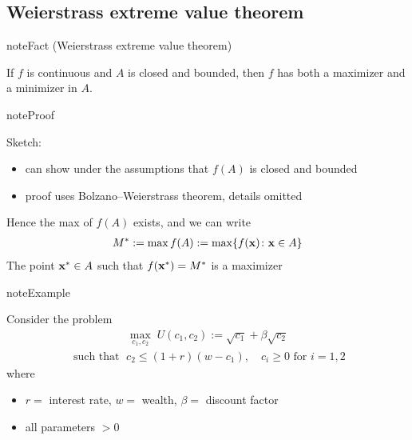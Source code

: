 \documentclass[letterpaper,10pt,english]{jupyterBook}
\begin{document}
\subsection{Weierstrass extreme value theorem}
\label{\detokenize{06.optimization_fundamentals:weierstrass-extreme-value-theorem}}
\begin{sphinxadmonition}{note}{Fact (Weierstrass extreme value theorem)}

\sphinxAtStartPar
If \(f\) is continuous and \(A\) is closed and bounded, then \(f\) has both a maximizer and a minimizer in \(A\).
\end{sphinxadmonition}

\begin{sphinxadmonition}{note}{Proof}

\sphinxAtStartPar
Sketch:
\begin{itemize}
\item {} 
\sphinxAtStartPar
can show under the assumptions that \(f(A)\) is closed and bounded

\item {} 
\sphinxAtStartPar
proof uses Bolzano–Weierstrass theorem, details omitted

\end{itemize}
\end{sphinxadmonition}

\sphinxAtStartPar
Hence the max of \(f(A)\) exists, and we can write
\begin{equation*}
\begin{split}
%
M^* := \max f(A) := \max \{ f({\bf x}) \colon {\bf x } \in A\}
%
\end{split}
\end{equation*}
\sphinxAtStartPar
The point \({\bf x}^* \in A\) such that \(f({\bf x}^*) = M^*\) is a maximizer

\begin{sphinxadmonition}{note}{Example}

\sphinxAtStartPar
Consider the problem
\begin{equation*}
\begin{split} 
%
\max_{c_1, c_2} \; U(c_1, c_2) := \sqrt{c_1} + \beta \sqrt{c_2} 
%
\end{split}
\end{equation*}\begin{equation*}
\begin{split}
%
\text{ such that } \; c_2 \leq (1 + r)(w - c_1), 
\quad c_i \geq 0 \text{ for } i = 1,2
%
\end{split}
\end{equation*}
\sphinxAtStartPar
where
\begin{itemize}
\item {} 
\sphinxAtStartPar
\(r=\) interest rate, \(w=\) wealth, \(\beta=\) discount factor

\item {} 
\sphinxAtStartPar
all parameters \(> 0\)

\end{itemize}
\end{sphinxadmonition}
\end{document}
